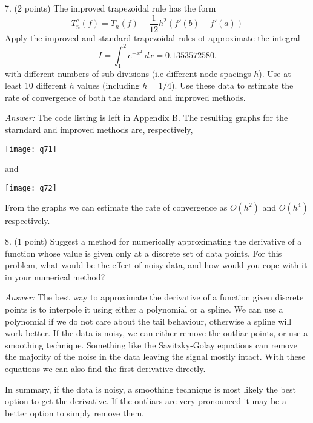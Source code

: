 \documentclass{article}
\newenvironment{answer}{\textit{Answer:}}{}
\begin{document}
7. (2 points) The improved trapezoidal rule has the form
\begin{equation*}
    T_n^c(f) = T_n(f) - \frac{1}{12}h^2(f'(b) - f'(a))
\end{equation*}
Apply the improved and standard trapezoidal rules ot approximate the integral
\begin{equation*}
    I = \int_1^2 e^{-x^2} \ dx = 0.1353572580.
\end{equation*}
with different numbers of sub-divisions (i.e different node spacings $h$).
Use at least 10 different $h$ values (including $h = 1/4$). Use these data to
estimate the rate of convergence of both the standard and improved methods.

\begin{answer}
    The code listing is left in Appendix B. The resulting graphs for the
    starndard and improved methods are, respectively,

    \texttt{[image: q71]}

    and

    \texttt{[image: q72]}

    From the graphs we can estimate the rate of convergence as $O(h^2)$ and
    $O(h^4)$ respectively.
\end{answer}

8. (1 point) Suggest a method for numerically approximating the derivative of
a function whose value is given only at a discrete set of data points.
For this problem, what would be the effect of noisy data, and how would you cope
with it in your numerical method?

\begin{answer}
    The best way to approximate the derivative of a function given discrete
    points is to interpole it using either a polynomial or a spline. We can
    use a polynomial if we do not care about the tail behaviour, otherwise
    a spline will work better. If the data is noisy, we can either remove
    the outliar points, or use a smoothing technique. Something like the
    Savitzky-Golay equations can remove the majority of the noise in the
    data leaving the signal mostly intact. With these equations we can
    also find the first derivative directly.

    In summary, if the data is noisy, a smoothing technique is most likely the
    best option to get the derivative. If the outliars are very pronounced it
    may be a better option to simply remove them.
\end{answer}
\end{document}
